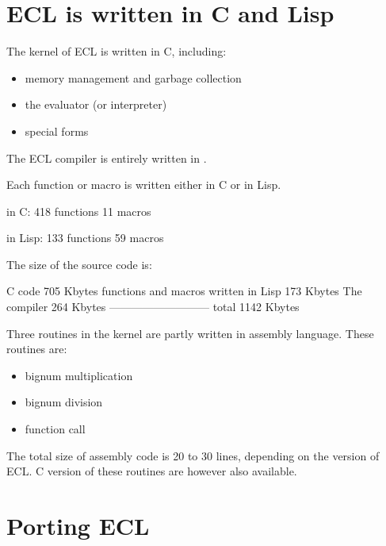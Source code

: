 \section{ECL is written in C and Lisp}

The kernel of ECL is written in C, including:

\begin{itemize}
\item memory management and garbage collection
\item the evaluator (or interpreter)
\item \clisp{} special forms
\end{itemize}

The ECL compiler is entirely written in \clisp.

Each \clisp{} function or macro is written either in C or in Lisp.

\begin{example}
        in C:
                418 \clisp{} functions
                11 \clisp{} macros

        in Lisp:
                133 \clisp{} functions
                59 \clisp{} macros
\end{example}

The size of the source code is:

\begin{example}
        C code         705 Kbytes
        \clisp{} functions and macros written in Lisp
                       173 Kbytes
        The compiler   264 Kbytes
        --------------------------- 
        total         1142 Kbytes
\end{example}

Three routines in the kernel are partly written
in assembly language.  These routines are:

\begin{itemize}
\item bignum multiplication
\item bignum division
\item function call
\end{itemize}

The total size of assembly code is 20 to 30 lines, depending on the
version of ECL. C version of these routines are however also available.

\section{Porting ECL}

